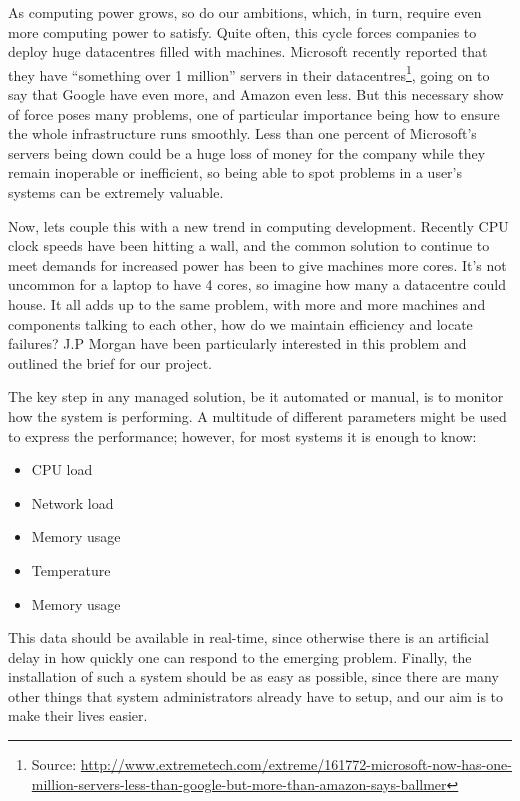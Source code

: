 \documentclass{l3proj}
\begin{document}
As computing power grows, so do our ambitions, which, in turn, require even more computing power to satisfy. Quite often, this cycle forces companies to deploy huge datacentres filled with machines. Microsoft recently reported that they have ``something over 1 million'' servers in their datacentres\footnote{\raggedright{}Source: \url{http://www.extremetech.com/extreme/161772-microsoft-now-has-one-million-servers-less-than-google-but-more-than-amazon-says-ballmer}}, going on to say that Google have even more, and Amazon even less. But this necessary show of force poses many problems, one of particular importance being how to ensure the whole infrastructure runs smoothly. Less than one percent of Microsoft's servers being down could be a huge loss of money for the company while they remain inoperable or inefficient, so being able to spot problems in a user's systems can be extremely valuable.

Now, lets couple this with a new trend in computing development. Recently CPU clock speeds have been hitting a wall, and the common solution to continue to meet demands for increased power has been to give machines more cores. It's not uncommon for a laptop to have 4 cores, so imagine how many a datacentre could house. It all adds up to the same problem, with more and more machines and components talking to each other, how do we maintain efficiency and locate failures? J.P Morgan have been particularly interested in this problem and outlined the brief for our project.

The key step in any managed solution, be it automated or manual, is to monitor how the system is performing. A multitude of different parameters might be used to express the performance; however, for most systems it is enough to know:

\begin{itemize}
  \item CPU load
  \item Network load
  \item Memory usage
  \item Temperature
  \item Memory usage
\end{itemize}

This data should be available in real-time, since otherwise there is an artificial delay in how quickly one can respond to the emerging problem. Finally, the installation of such a system should be as easy as possible, since there are many other things that system administrators already have to setup, and our aim is to make their lives easier.
\end{document}
